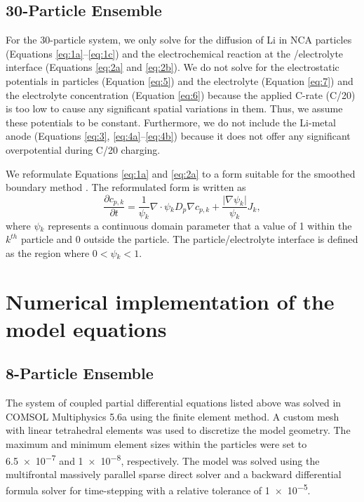 \documentclass{article}
\begin{document}
\subsection{30-Particle Ensemble}

For the 30-particle system, we only solve for the diffusion of Li in
NCA particles (Equations \ref{eq:1a}--\ref{eq:1c}) and the
electrochemical reaction at the \nca{}/electrolyte interface
(Equations \ref{eq:2a} and \ref{eq:2b}). We do not solve for the
electrostatic potentials in \nca{} particles (Equation \ref{eq:5}) and
the electrolyte (Equation \ref{eq:7}) and the electrolyte
concentration (Equation \ref{eq:6}) because the applied C-rate (C/20)
is too low to cause any significant spatial variations in them. Thus,
we assume these potentials to be constant.  Furthermore, we do not
include the Li-metal anode (Equations \ref{eq:3},
\ref{eq:4a}--\ref{eq:4b}) because it does not offer any significant
overpotential during C/20 charging.

We reformulate Equations \ref{eq:1a} and \ref{eq:2a} to a form suitable
for the smoothed boundary method \cite{thornton2012,thornton2018}. The
reformulated form is written as \cite{thornton2018}
\begin{equation}
  \frac{\partial c_{p,k}}{\partial t}=\frac 1{\psi{}_k}\nabla \cdot \psi{}_kD_p\nabla c_{p,k}+\frac{\left|\nabla \psi{}_k\right|}{\psi{}_k}J_k,
  \label{eq:8}
\end{equation}
where $\psi{}_k$ represents a continuous domain parameter that a
value of 1 within the $k^{\mathit{th}}$ particle and 0 outside the
particle. The particle/electrolyte interface is defined as the region
where $ 0 < \psi{}_k < 1 $.


\section{Numerical implementation of the model equations}

\subsection{8-Particle Ensemble}

The system of coupled partial differential equations listed above was
solved in COMSOL Multiphysics 5.6a using the finite element method. A
custom mesh with linear tetrahedral elements was used to discretize
the model geometry. The maximum and minimum element sizes within the
\nca{} particles were set to \num{6.5e-7} and \num{1e-8},
respectively. The model was solved using the multifrontal massively
parallel sparse direct solver \cite{lexcellent2000} and a backward differential
formula solver for time-stepping with a relative tolerance of
\num{1e-5}.
\end{document}
